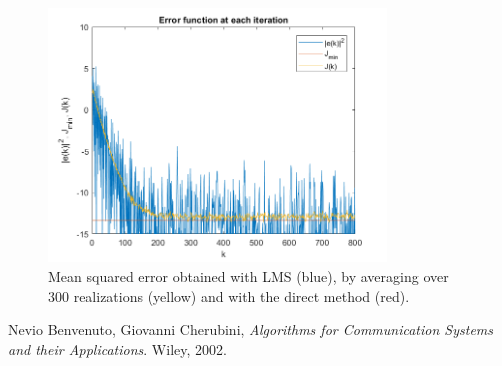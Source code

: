 \documentclass[a4paper, 12pt]{report}
\begin{document}
\begin{figure}[H]
	\centering
	\includegraphics[width=0.8\textwidth]{err_lms}
	\caption{Mean squared error obtained with LMS (blue), by averaging over 300 realizations (yellow) and with the direct method (red).}
	\label{fig:err_lms}
\end{figure}

\begin{thebibliography}{15}
	Nevio Benvenuto, Giovanni Cherubini,
	\textit{Algorithms for Communication Systems and their Applications}. 
	Wiley, 2002.
\end{thebibliography}
\end{document}
